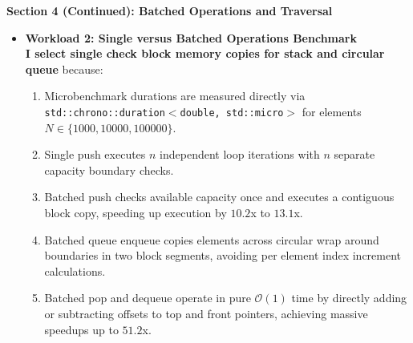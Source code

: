 \documentclass[10pt,a4paper]{article}
\begin{document}
\clearpage


\begin{center}
    {\Large \textbf{Section 4 (Continued): Batched Operations and Traversal}}
\end{center}

\begin{itemize}[leftmargin=1.2em,noitemsep,topsep=2pt,parsep=1pt]
    \item \textbf{Workload 2: Single versus Batched Operations Benchmark}\\[3pt]
    \textbf{I select single check block memory copies for stack and circular queue} because:
    \begin{enumerate}[label=\arabic*),leftmargin=1.5em,noitemsep,topsep=1pt,parsep=1pt]
        \item Microbenchmark durations are measured directly via \texttt{std::chrono::duration$<$double, std::micro$>$} for elements $N \in \{1000, 10000, 100000\}$.
        \item Single push executes $n$ independent loop iterations with $n$ separate capacity boundary checks.
        \item Batched push checks available capacity once and executes a contiguous block copy, speeding up execution by $10.2$x to $13.1$x.
        \item Batched queue enqueue copies elements across circular wrap around boundaries in two block segments, avoiding per element index increment calculations.
        \item Batched pop and dequeue operate in pure $\mathcal{O}(1)$ time by directly adding or subtracting offsets to top and front pointers, achieving massive speedups up to $51.2$x.
    \end{enumerate}


\end{itemize}
\end{document}
